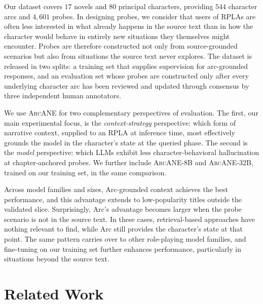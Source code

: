 \documentclass{llmxive}
\providecommand{\ours}{\textsc{ArcANE}}
\begin{document}
Our dataset covers $17$ novels and $80$ principal characters, providing $544$ character arcs and $4{,}601$ probes. In designing probes, we consider that users of RPLAs are often less interested in what already happens in the source text than in how the character would behave in entirely new situations they themselves might encounter. Probes are therefore constructed not only from source-grounded scenarios but also from situations the source text never explores. The dataset is released in two splits: a training set that supplies supervision for arc-grounded responses, and an evaluation set whose probes are constructed only after every underlying character arc has been reviewed and updated through consensus by three independent human annotators.

We use \ours{} for two complementary perspectives of evaluation. The first, our main experimental focus, is the \emph{context-strategy} perspective: which form of narrative context, supplied to an RPLA at inference time, most effectively grounds the model in the character's state at the queried phase. The second is the \emph{model} perspective: which LLMs exhibit less character-behavioral hallucination at chapter-anchored probes. We further include \ours{}-8B and \ours{}-32B, trained on our training set, in the same comparison.

Across model families and sizes, Arc-grounded context achieves the best performance, and this advantage extends to low-popularity titles outside the validated slice. Surprisingly, Arc's advantage becomes larger when the probe scenario is not in the source text. In these cases, retrieval-based approaches have nothing relevant to find, while Arc still provides the character's state at that point. The same pattern carries over to other role-playing model families, and fine-tuning on our training set further enhances performance, particularly in situations beyond the source text.

\section{Related Work\label{sec:related}}
\end{document}
